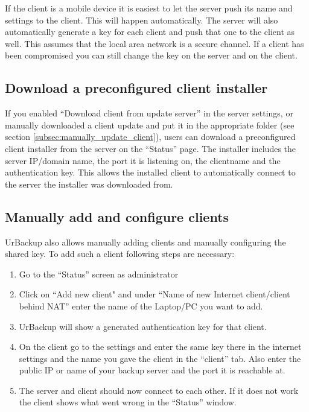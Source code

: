 \documentclass[a4paper,10pt]{article}
\begin{document}
If the client is a mobile device it is easiest to let the server push its name and
settings to the client. This will happen automatically. The server will also automatically
generate a key for each client and push that one to the client as well. This assumes that
the local area network is a secure channel. If a client has been compromised you can still
change the key on the server and on the client.

\subsection{Download a preconfigured client installer}

If you enabled ``Download client from update server'' in the server settings, or manually
downloaded a client update and put it in the appropriate folder (see section \ref{subsec:manually_update_client}),
users can download a preconfigured client installer from the server on the ``Status'' page.
The installer includes the server IP/domain name, the port it is listening on, the clientname and the authentication key.
This allows the installed client to automatically connect to the server the installer was downloaded from.

\subsection{Manually add and configure clients}
\label{manual_internet_client}

UrBackup also allows manually adding clients and manually configuring the shared key. To
add such a client following steps are necessary:

\begin{enumerate}
  \item Go to the ``Status'' screen as administrator
  \item Click on ``Add new client" and under ``Name of new Internet client/client behind NAT'' enter the name of the Laptop/PC you want to add.
  \item UrBackup will show a generated authentication key for that client.
  \item On the client go to the settings and enter the same key there in the internet settings and the name you gave the client in the ``client'' tab.
  Also enter the public IP or name of your backup server and the port it is reachable at.
  \item The server and client should now connect to each other. If it does not work the client shows what went wrong
  in the ``Status'' window.
\end{enumerate}
\end{document}
